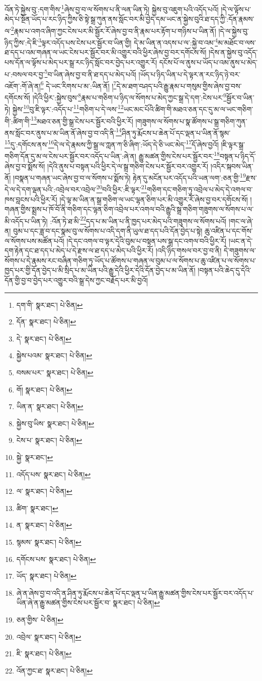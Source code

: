 འོན་ཏེ་སྐྱེས་བུ་:དག་གིས་\footnote{དག་གི་  སྣར་ཐང་།  པེ་ཅིན། }ཞེས་བྱ་བ་ལ་སོགས་པ་ནི་ལན་ཡིན་ཏེ། སྐྱེས་བུ་འཇུག་པའི་འདོད་པའོ། །དེ་ལ་ལྟོས་པ་མེད་པ་སྔོན་ཡོད་པ་རང་ཉིད་ཀྱིས་ཅི་སྟེ་སྒྲ་ཀུན་ནས་སློང་བར་མི་བྱེད་དམ་ཡང་ན་སྐྱེས་བུའི་ཐ་དད་ཀྱི་:དོན་རྣམས་ལ་\footnote{དོན་  སྣར་ཐང་།  པེ་ཅིན། }རྣམ་པ་འགའ་ཞིག་ཀྱང་ངེས་པར་མི་སྦྱོར་རོ་ཞེས་བྱ་བ་ནི་རྣམ་པར་རྟོག་པ་གཉིས་པ་ཡིན་ནོ། །དེ་ལ་སྐྱེས་བུ་ཉིད་ཀྱིས་:དེ་ཇི་\footnote{དེ་  སྣར་ཐང་།  པེ་ཅིན། }ལྟར་འདོད་པས་ངེས་པར་སྦྱོར་བ་ཡིན་གྱི། དེ་མ་ཡིན་ན་འདས་པ་ལ་:སྐྱེ་བ་འམ་\footnote{སྐྱེས་པའམ་  སྣར་ཐང་།  པེ་ཅིན། }མ་མཐོང་བ་ལས་ཐ་དད་པ་འམ་གཞན་ལ་ཡང་ངེས་པར་སྦྱོར་བར་མི་འགྱུར་བའི་ཕྱིར་ཞེས་བྱ་བར་དགོངས་སོ། །དེས་ན་སྐྱེས་བུ་འདོད་པས་དོན་ལ་ལྟོས་པ་མེད་པར་སྒྲ་རང་ཉིད་སློང་བར་བྱེད་པར་འགྱུར་རོ། དངོས་པོ་ལ་ནུས་པ་ཡོད་པ་འམ་ནུས་པ་མེད་པ་:བསལ་བར་བྱ་\footnote{བསམ་པར་་  སྣར་ཐང་།  པེ་ཅིན། }བ་ཡིན་ཞེས་བྱ་བ་ནི་ཐ་དད་པ་མེད་པའོ། །ཡོད་པ་ཉིད་ཡིན་པ་དེ་ལྟར་ན་རང་ཉིད་ཉེ་བར་འཇོག་:གོ་ཞེ་ན།\footnote{གོ།  སྣར་ཐང་།  པེ་ཅིན། } དེ་ཡང་རིགས་པ་མ་:ཡིན་ནོ། །\footnote{ཡིན་ན་  སྣར་ཐང་།  པེ་ཅིན། }དེ་མ་ཐག་བཤད་པའི་རྒྱུ་རྣམ་པ་གསུམ་གྱིས་ཞེས་བྱ་བས་དགོངས་སོ། །དེའི་ཕྱིར་:སྐྱེས་བུས་\footnote{སྐྱེས་བུ་ཡིས་  སྣར་ཐང་།  པེ་ཅིན། }རྣམ་པ་གཅིག་པ་ཉིད་ལ་སོགས་པ་མེད་ཀྱང་སྒྲ་དེ་དག་:ངེས་པར་\footnote{ངེས་པ་  སྣར་ཐང་།  པེ་ཅིན། }སྦྱོར་བ་ཡིན་ཏེ། སྐྱེས་\footnote{སྐྱེ་  སྣར་ཐང་། }བུ་ཇི་ལྟར་:འདོད་པ་\footnote{འདོད་པས་  སྣར་ཐང་།  པེ་ཅིན། }གཅིག་པ་དེ་ལས་\footnote{ལ་  སྣར་ཐང་།  པེ་ཅིན། }ཡང་མང་པོའི་ཚིག་གི་མཐའ་ཅན་དང་དུ་མ་ལ་ཡང་གཅིག་གི་:ཚིག་གི་\footnote{ཚིག་  སྣར་ཐང་། }མཐའ་ཅན་གྱི་སྒྲ་ངེས་པར་སྦྱོར་བའི་ཕྱིར་རོ། །གཟུགས་ལ་སོགས་པ་སྣ་ཚོགས་པ་སྒྲ་གཅིག་ཀུན་ནས་སློང་བར་ནུས་པ་མ་ཡིན་ནོ་ཞེས་བྱ་བ་འདི་ནི་\footnote{ན་  སྣར་ཐང་།  པེ་ཅིན། }ཤིན་ཏུ་རྨོངས་པ་ཆེན་པོ་དང་ལྡན་པ་ཡིན་ནོ་སྙམ་\footnote{སྙམས་  སྣར་ཐང་།  པེ་ཅིན། }དུ་:དགོངས་ནས་\footnote{དགོངས་པས་  སྣར་ཐང་།  པེ་ཅིན། }དེ་ལ་དེ་རྣམས་ཀྱི་སྒྲ་ལ་ཀླན་ཀ་ཅི་ཞིག་:ཡོད་དེ་ཅི་ཡང་མེད་\footnote{ཡོད་  སྣར་ཐང་།  པེ་ཅིན། }དོ་ཞེས་བྱའོ། །ཇི་ལྟར་སྒྲ་གཅིག་དོན་དུ་མ་ལ་ངེས་པར་སྦྱོར་བར་འདོད་པ་ཡིན་:ཞེ་ན། རྒྱུ་མཚན་གྱིས་ངེས་པར་སྦྱོར་བར་\footnote{ཞེ་ན་ཞེས་བྱ་བ་འདི་ན་ཤིན་ཏུ་རྨོངས་པ་ཆེན་པོ་དང་ལྡན་པ་ཡིན་རྒྱུ་མཚན་གྱིས་ངེས་པར་སྦྱོར་བར་འདོད་པ་ཡིན་ཞེ་ན་རྒྱུ་མཚན་གྱིས་ངེས་པར་སྦྱོར་བ་  སྣར་ཐང་།  པེ་ཅིན། }བསྟན་པ་ཉིད་དོ་ཞེས་བྱ་བ་སྨོས་སོ། །དེའི་ནུས་པ་བསྟན་པའི་ཕྱིར་དེ་ལ་སྒྲ་གཅིག་ངེས་པར་སྦྱོར་བར་འགྱུར་རོ། །འདིར་སྐབས་ཡིན་ནོ། །བསྣན་པ་གཞན་ཡང་ཞེས་བྱ་བ་ལ་སོགས་པ་སྨོས་ཏེ། རྟེན་དུ་མངོན་པར་འདོད་པའི་ཡན་ལག་:ཅན་གྱི་\footnote{ཅན་གྱིས་  པེ་ཅིན། }རྫས་དེ་ལ་དེ་དག་ལྡན་པའི་:འབྲེལ་བར་འབྲེལ་\footnote{འབྲེལ་  སྣར་ཐང་།  པེ་ཅིན། }བའི་ཕྱིར་:ཇི་ལྟར་\footnote{ཇི་  སྣར་ཐང་།  པེ་ཅིན། }གཅིག་དང་གཅིག་ཏུ་འབྲེལ་པ་མེད་དེ་འགལ་བ་ཁས་བླངས་པའི་ཕྱིར་རོ། །དེ་ལྟ་མ་ཡིན་ན་སྒྲ་གཅིག་ལ་ཡང་ལྷན་ཅིག་པར་མི་འགྱུར་རོ་ཞེས་བྱ་བར་དགོངས་སོ། །གཞན་གྱིས་སྨྲས་པ་ཁོ་བོ་ནི་གཅིག་དང་ལྷན་ཅིག་འབྲེལ་པར་འགལ་བའི་རྒྱུའི་སྒྲ་གཅིག་གཟུགས་ལ་སོགས་པ་ལ་མི་འདོད་པ་ཡིན་ཏེ། :འོན་ཏེ་ཐ་མི་\footnote{འོན་ཀྱང་ཐ་  སྣར་ཐང་།  པེ་ཅིན། }དད་པ་མ་ཡིན་པ་ནི་ཁྱད་པར་མེད་པའི་གཟུགས་ལ་སོགས་པའོ། །གང་ལ་ཞེ་ན། བུམ་པ་དང་ཟླ་བ་དང་སྣམ་བུ་ལ་སོགས་པ་འདི་དག་ནི་ཡུལ་ཐ་དད་པའི་དོན་བྱེད་པ་སྟེ། ཆུ་འཛིན་པ་དང་གོས་ལ་སོགས་པས་མཚོན་པའོ། །དེ་དང་འགལ་བ་ལྟར་དེའི་བུམ་པ་བསྟན་པས་སྒྲ་དང་འགལ་བའི་ཕྱིར་རོ། །ཡང་ན་དེ་དག་རྟེན་དང་ཐ་དད་པ་མེད་པ་དེ་རྫས་ལ་ཐ་དད་པ་མེད་པའི་ཕྱིར་རོ། །འདི་ཉིད་གསལ་བར་བྱ་བ་ནི། དེ་གཟུགས་ལ་སོགས་པ་དེ་རྣམས་རང་བཞིན་གཅིག་ཏུ་ཡོད་པ་ཚོགས་པ་གཞན་ལ་བུམ་པ་ལ་སོགས་པ་ཆུ་འཛིན་པ་ལ་སོགས་པ་ཁྱད་པར་གྱི་དོན་བྱེད་པ་མི་སྲིད་པ་མ་ཡིན་པའི་རྒྱུ་དེའི་ཕྱིར་དེའི་དོན་བྱེད་པ་མ་ཡིན་ནོ། །བསྟན་པའི་ཆེད་དུ་དེའི་དོན་གྱི་བྱ་བ་བྱེད་པར་འགྱུར་བའི་སྒྲ་དེས་ཀྱང་བརྗོད་པར་མི་བྱའོ། 
